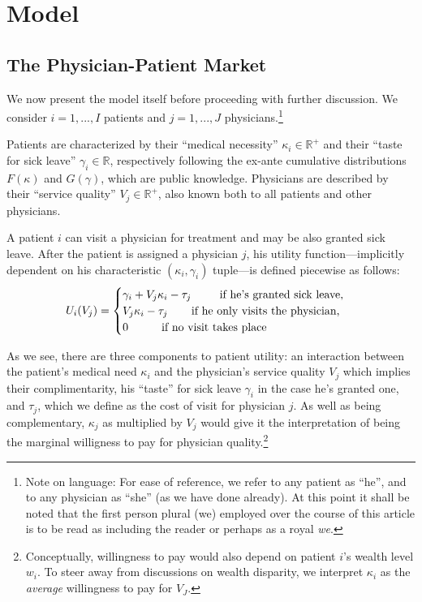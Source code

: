 \documentclass[../main.tex]{subfiles}
\begin{document}
\section{Model}

\subsection{The Physician-Patient Market}
\label{sec:3_1}

We now present the model itself before proceeding with further discussion. We consider $i = 1, ..., I$ patients and $j = 1, ..., J$ physicians.\footnote{Note on language: For ease of reference, we refer to any patient as ``he'', and to any physician as ``she'' (as we have done already). At this point it shall be noted that the first person plural (we) employed over the course of this article is to be read as including the reader or perhaps as a royal \textit{we}.}

Patients are characterized by their ``medical necessity'' $\kappa_i \in \mathbb{R}^+$ and their ``taste for sick leave'' $\gamma_i \in \mathbb{R}$, respectively following the ex-ante cumulative distributions $F(\kappa)$ and $G(\gamma)$, which are public knowledge. Physicians are described by their ``service quality'' $V_j \in \mathbb{R}^+$, also known both to all patients and other physicians.

A patient $i$ can visit a physician for treatment and may be also granted sick leave. After the patient is assigned a physician $j$, his utility function—implicitly dependent on his characteristic $(\kappa_i,\gamma_i)$ tuple—is defined piecewise as follows:
    \[
U_i(V_j) =\begin{cases}
\gamma_i + V_j \kappa_i - \tau_j \text{  \hspace{0.65cm} if he's granted sick leave,} \\
V_j \kappa_i - \tau_j \text{  \hspace{0.5cm} if he only visits the physician,} \\
0 \text{  \hspace{0.8cm} if no visit takes place}
\end{cases}
\]

As we see, there are three components to patient utility: an interaction between the patient's medical need $\kappa_i$ and the physician's service quality $V_j$ which implies their complimentarity, his ``taste'' for sick leave $\gamma_i$ in the case he's granted one, and $\tau_j$, which we define as the cost of visit for physician $j$. As well as being complementary, $\kappa_j$ as multiplied by $V_j$ would give it the interpretation of being the marginal willigness to pay for physician quality.\footnote{Conceptually, willingness to pay would also depend on patient $i$'s wealth level $w_i$. To steer away from discussions on wealth disparity, we interpret $\kappa_i$ as the \textit{average} willingness to pay for $V_J$.}
\end{document}
